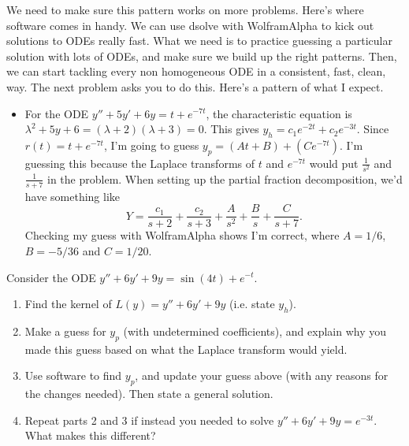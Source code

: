 We need to make sure this pattern works on more problems. Here's where software comes in handy.  We can use dsolve with WolframAlpha to kick out solutions to ODEs really fast. What we need is to practice guessing a particular solution with lots of ODEs, and make sure we build up the right patterns.  Then, we can start tackling every non homogeneous ODE in a consistent, fast, clean, way. The next problem asks you to do this.  Here's a pattern of what I expect.
\begin{itemize}
 \item For the ODE $y''+5y'+6y=t+e^{-7t}$, the characteristic equation is $\lambda^2+5y+6 = (\lambda+2)(\lambda+3)=0$. This gives $y_h=c_1e^{-2t}+c_2e^{-3t}$.  Since $r(t)=t+e^{-7t}$, I'm going to guess $y_p=(At+B)+(Ce^{-7t})$. I'm guessing this because the Laplace transforms of $t$ and $e^{-7t}$ would put $\frac{1}{s^2}$ and $\frac{1}{s+7}$ in the problem. When setting up the partial fraction decomposition, we'd have something like $$Y = \frac{c_1}{s+2}+\frac{c_2}{s+3} +\frac{A}{s^2}+\frac{B}{s}+\frac{C}{s+7}.$$ Checking my guess with WolframAlpha shows I'm correct, where $A=1/6$, $B=-5/36$ and $C=1/20$.  
\end{itemize}




\begin{problem}
Consider the ODE $y''+6y'+9y=\sin(4t)+e^{-t}$.
\begin{enumerate}
 \item Find the kernel of $L(y) = y''+6y'+9y$ (i.e. state $y_h$). 
 \item Make a guess for $y_p$ (with undetermined coefficients), and explain why you made this guess based on what the Laplace transform would yield.
 \item Use software to find $y_p$, and update your guess above (with any reasons for the changes needed). %
 Then state a general solution.
 \item Repeat parts 2 and 3 if instead you needed to solve $y''+6y'+9y=e^{-3t}$. What makes this different?
\end{enumerate}

\end{problem}

